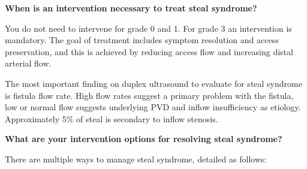 \documentclass[
]{book}
\begin{document}
\textbf{When is an intervention necessary to treat steal syndrome?}

You do not need to intervene for grade 0 and 1.\citep{leake2015} For grade 3
an intervention is mandatory. The goal of treatment includes symptom
resolution and access preservation, and this is achieved by reducing
access flow and increasing distal arterial flow.

The most important finding on duplex ultrasound to evaluate for steal
syndrome is fistula flow rate. High flow rates suggest a primary problem
with the fistula, low or normal flow suggests underlying PVD and inflow
insufficiency as etiology.\citep{alshakarchi2016, leake2015} Approximately
5\% of steal is secondary to inflow stenosis.

\textbf{What are your intervention options for resolving steal syndrome?}

There are multiple ways to manage steal syndrome, detailed as
follows:\citep{leake2015, gupta2011}
\end{document}
